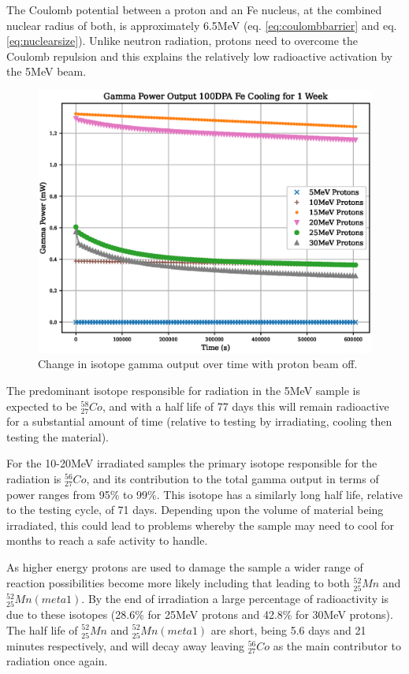 The Coulomb potential between a proton and an \Gls{Fe} nucleus, at the combined nuclear radius of both, is approximately 6.5MeV (eq. \ref{eq:coulombbarrier} and eq. \ref{eq:nuclearsize}).  Unlike neutron radiation, protons need to overcome the Coulomb repulsion and this explains the relatively low radioactive activation by the 5MeV beam.  

\begin{figure}[htb]
\centering
\includegraphics[width=0.7\linewidth]{chapters/activity_code/fe_100dpa/cooling.eps}
\caption{Change in isotope gamma output over time with proton beam off.}
\label{fig:activity-v2-residual-b}
\end{figure}

The predominant isotope responsible for radiation in the 5MeV sample is expected to be ${}^{58}_{27}Co$, and with a half life of 77 days this will remain radioactive for a substantial amount of time (relative to testing by irradiating, cooling then testing the material).

For the 10-20MeV irradiated samples the primary isotope responsible for the radiation is ${}^{56}_{27}Co$, and its contribution to the total gamma output in terms of power ranges from 95\% to 99\%.  This isotope has a similarly long half life, relative to the testing cycle, of 71 days.  Depending upon the volume of material being irradiated, this could lead to problems whereby the sample may need to cool for months to reach a safe activity to handle.

As higher energy protons are used to damage the sample a wider range of reaction possibilities become more likely including that leading to both ${}^{52}_{25}Mn$ and ${}^{52}_{25}Mn (meta 1)$.  By the end of irradiation a large percentage of radioactivity is due to these isotopes (28.6\% for 25MeV protons and 42.8\% for 30MeV protons).  The half life of ${}^{52}_{25}Mn$ and ${}^{52}_{25}Mn (meta 1)$ are short, being 5.6 days and 21 minutes respectively, and will decay away leaving ${}^{56}_{27}Co$ as the main contributor to radiation once again.

